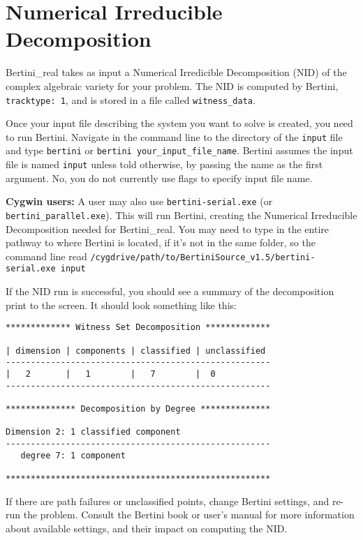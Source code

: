 \section{Numerical Irreducible Decomposition}

Bertini\_real takes as input a Numerical Irredicible Decomposition (NID) of the complex algebraic variety for your problem.  The NID is computed by Bertini, {\tt tracktype: 1}, and is stored in a file called {\tt witness\_data}.


Once your input file describing the system you want to solve is created, you need to run Bertini.  Navigate in the command line to the directory of the {\tt input} file and type \texttt{bertini} or \texttt{bertini your\_input\_file\_name}.  Bertini assumes the input file is named {\tt input} unless told otherwise, by passing the name as the first argument.  No, you do not currently use flags to specify input file name.

\textbf{Cygwin users:} A user may also use \texttt{bertini-serial.exe} (or \texttt{bertini\_parallel.exe}). This will run Bertini, creating the Numerical Irreducible Decomposition needed for Bertini\_real.  You may need to type in the entire pathway to where Bertini is located, if it's not in the same folder, so the command line read \newline \texttt{/cygdrive/path/to/BertiniSource\_v1.5/bertini-serial.exe input}


If the NID run is successful, you should see a summary of the decomposition print to the screen.  It should look something like this:

\begin{lstlisting}[caption={Example NID output, tracktype 1 in Bertini 1}, captionpos=b]
************* Witness Set Decomposition *************

| dimension | components | classified | unclassified
-----------------------------------------------------
|   2       |   1        |   7        |  0
-----------------------------------------------------

************** Decomposition by Degree **************

Dimension 2: 1 classified component
-----------------------------------------------------
   degree 7: 1 component

*****************************************************
\end{lstlisting}


If there are path failures or unclassified points, change Bertini settings, and re-run the problem.  Consult the Bertini book or user's manual for more information about available settings, and their impact on computing the NID.

